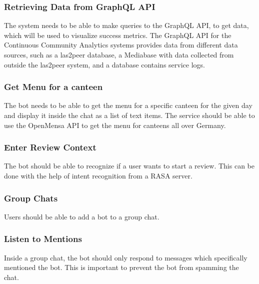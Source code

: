 \subsubsection{Retrieving Data from GraphQL API}
The system needs to be able to make queries to the GraphQL API, to get data, which will be used to visualize success metrics. The GraphQL API  for the Continuous Community Analytics systems provides data from different data sources, such as a las2peer database, a Mediabase with data collected from outside the las2peer system, and a database contains service logs.

\subsubsection{Get Menu for a canteen} The bot needs to be able to get the menu for a specific canteen for the given day and display it inside the chat as a list of text items. The service should be able to use the OpenMensa API \footnotemark to get the menu for canteens all over Germany.


\subsubsection{Enter Review Context} The bot should be able to recognize if a user wants to start a review. This can be done with the help of intent recognition from a RASA server.

\subsubsection{Group Chats} Users should be able to add a bot to a group chat.

\subsubsection{Listen to Mentions} Inside a group chat, the bot should only respond to messages which specifically mentioned the bot. This is important to prevent the bot from spamming the chat.


